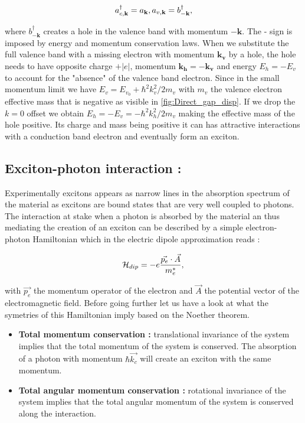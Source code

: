 \begin{equation}
    a^{\dagger}_{c,\mathbf{k}} = a_{\mathbf{k}}, \\
    a_{v,\mathbf{k}} = b^{\dagger}_{\mathbf{-k}},
    \label{eq:hole_creation_operator}
\end{equation}

\noindent where $b^{\dagger}_{\mathbf{-k}}$ creates a hole in the valence band with momentum $-\mathbf{k}$. The - sign 
is imposed by energy and momentum conservation laws. When we substitute the full valence band with a missing electron with momentum $\mathbf{k_v}$ by a hole, the hole needs to have opposite charge $+|e|$, momentum $\mathbf{k_h}=-\mathbf{k_v}$ and energy $E_h = - E_v$ to account for the "absence" of the valence band electron. 
Since in the small momentum limit we have $E_v = E_{v_0}+ \hbar^2 k_v^2/2m_v$ with $m_v$ the valence electron effective mass that is negative as visible in \autoref{fig:Direct_gap_disp}.
If we drop the $k=0$ offset we obtain $E_h = -E_v =  - \hbar^2 k_h^2/2m_v$ making the effective mass of the hole positive. Its charge and mass being positive it can has attractive interactions 
with a conduction band electron and eventually form an exciton.

\subsection{Exciton-photon interaction :} Experimentally excitons appears as narrow lines in the absorption spectrum of the material as excitons are bound states that are very well coupled to photons. 
The interaction at stake when a photon is absorbed by the material an thus mediating the creation of an exciton can be described by a simple electron-photon Hamiltonian which in the electric dipole approximation reads :

\begin{equation}
    \mathcal{H}_{dip} = -e \dfrac{\vec{p_e} \cdot \vec{A}}{m^*_e},
\end{equation}

with $\vec{p_e}$ the momentum operator of the electron and $\vec{A}$ the potential vector of the electromagnetic field. Before going further let us have a look at what the symetries of this Hamiltonian imply based on the Noether theorem.

\begin{itemize}
    \item \textbf{Total momentum conservation :}  translational invariance of the system implies that the total momentum of the system is conserved. The absorption of a photon with momentum 
    $\hbar \vec{k_c}$ will create an exciton with the same momentum.
    \item  \textbf{Total angular momentum conservation :} rotational invariance of the system implies that the total angular momentum of the system is conserved along the interaction.
\end{itemize}

